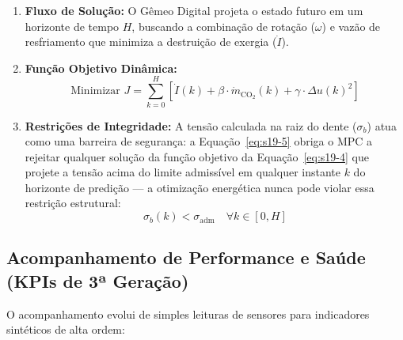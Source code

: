 \documentclass[12pt,a4paper]{article}
\numberwithin{equation}{section}
\numberwithin{table}{section}
\numberwithin{figure}{section}
\begin{document}
\begin{enumerate}
	\item \textbf{Fluxo de Solução:}
	O Gêmeo Digital projeta o estado futuro em um horizonte de tempo $H$, buscando a combinação de rotação ($\omega$) e vazão de resfriamento que minimiza a destruição de exergia ($\dot{I}$).
	
	\item \textbf{Função Objetivo Dinâmica:}
	\begin{equation}\label{eq:s19-4}
 \text{Minimizar } J = \sum_{k=0}^{H} \left[ \dot{I}(k) + \beta \cdotp \dot{m}_{\text{CO}_2}(k) + \gamma \cdotp \Delta u(k)^2 \right] 
\end{equation}
	
	\item \textbf{Restrições de Integridade:}
	A tensão calculada na raiz do dente ($\sigma_b$) atua como uma barreira de segurança: a Equação~\eqref{eq:s19-5} obriga o MPC a rejeitar qualquer solução da função objetivo da Equação~\eqref{eq:s19-4} que projete a tensão acima do limite admissível em qualquer instante $k$ do horizonte de predição — a otimização energética nunca pode violar essa restrição estrutural:
	\begin{equation}\label{eq:s19-5}
 \sigma_b(k) < \sigma_{\text{adm}} \quad \forall k \in [0, H]
\end{equation}
\end{enumerate}

\subsection{Acompanhamento de Performance e Saúde (KPIs de 3ª Geração)}

O acompanhamento evolui de simples leituras de sensores para indicadores sintéticos de alta ordem:
\end{document}
